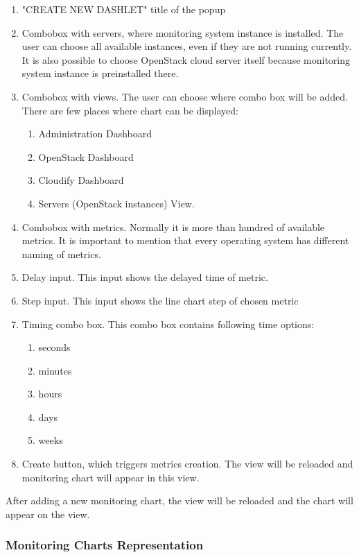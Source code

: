 \begin{enumerate}
\item "CREATE NEW DASHLET" title of the popup
\item Combobox with servers, where monitoring system instance is installed. The user can choose all available instances, even if they are not running currently. It is also possible to choose OpenStack cloud server itself because monitoring system instance is preinstalled there.
\item Combobox with views.  The user can choose where combo box will be added. There are few places where chart can be displayed:
\begin{enumerate}
\item Administration Dashboard
\item OpenStack Dashboard
\item Cloudify Dashboard
\item Servers (OpenStack instances) View. 
\end{enumerate}
\item Combobox with metrics. Normally it is more than hundred of available metrics. It is important to mention that every operating system has different naming of metrics.
\item Delay input. This input shows the delayed time of metric.
\item Step input. This input shows the line chart step of chosen metric
\item Timing combo box. This combo box contains following time options:
\begin{enumerate}
\item seconds
\item minutes
\item hours
\item days
\item weeks
\end{enumerate}
\item Create button, which triggers metrics creation. The view will be reloaded and monitoring chart will appear in this view.
\end{enumerate}

After adding a new monitoring chart, the view will be reloaded and the chart will appear on the view. 

\subsubsection{Monitoring Charts Representation}\label{Monitoring chart representation}

